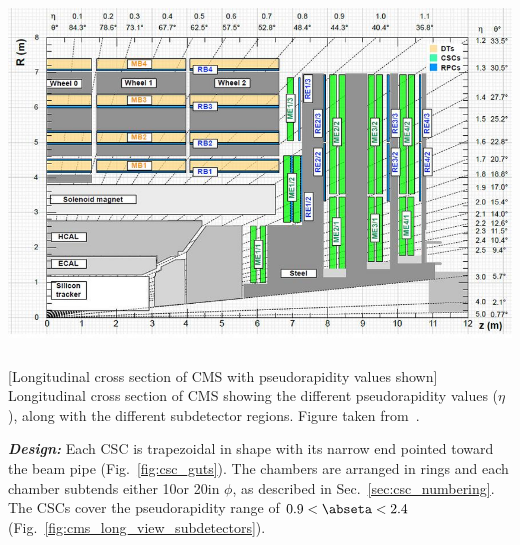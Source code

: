 \begin{multiFigure}
    \centering
    \includegraphics[width=15cm,height=10cm,keepaspectratio]{figures/cms/cms_longitudinal_view.png}
        [Longitudinal cross section of CMS with pseudorapidity values shown]
        {Longitudinal cross section of CMS showing the different pseudorapidity values ($\eta$), along with the different subdetector regions.
        Figure taken from~\cite{cms_long_xs_view}.
        }
    \label{fig:cms_long_view_subdetectors}
\end{multiFigure}
\textit{\textbf{Design:}}
Each CSC is trapezoidal in shape with its narrow end pointed toward the beam pipe (Fig.~\ref{fig:csc_guts}).
The chambers are arranged in rings and each chamber subtends either 10\degrees or 20\degrees in $\phi$, as described in Sec.~\ref{sec:csc_numbering}.
The CSCs cover the pseudorapidity range of $0.9 < \abseta < 2.4$ (Fig.~\ref{fig:cms_long_view_subdetectors}).

